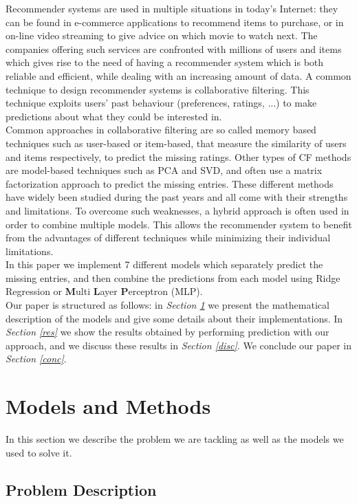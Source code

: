 \documentclass[10pt,conference,compsocconf]{IEEEtran}
\begin{document}
Recommender systems are used in multiple situations in today's Internet: they can be found in e-commerce applications to recommend items to purchase, or in on-line video streaming to give advice on which movie to watch next. The companies offering such services are confronted with millions of users and items which gives rise to the need of having a recommender system which is both reliable and efficient, while dealing with an increasing amount of data. A common technique to design recommender systems is collaborative filtering. This technique exploits users' past behaviour (preferences, ratings, ...) to make predictions about what they could be interested in.\\
Common approaches in collaborative filtering are so called memory based techniques such as user-based or item-based, that measure the similarity of users and items respectively, to predict the missing ratings. Other types of CF methods are model-based techniques such as PCA and SVD, and often use a matrix factorization approach to predict the missing entries. These different methods have widely been studied during the past years and all come with their strengths and limitations. To overcome such weaknesses, a hybrid approach is often used in order to combine multiple models. This allows the recommender system to benefit from the advantages of different techniques while minimizing their individual limitations.\\
In this paper we implement 7 different models which separately predict the missing entries, and then combine the predictions from each model using Ridge Regression or \textbf{M}ulti \textbf{L}ayer \textbf{P}erceptron (MLP).\\
Our paper is structured as follows: in \emph{Section \ref{mam}} we present the mathematical description of the models and give some details about their implementations. In \emph{Section \ref{res}} we show the results obtained by performing prediction with our approach, and we discuss these results in \emph{Section \ref{disc}}. We conclude our paper in \emph{Section \ref{conc}}.

\section{Models and Methods}
\label{mam}

In this section we describe the problem we are tackling as well as the models we used to solve it.

\subsection{Problem Description}
\end{document}
